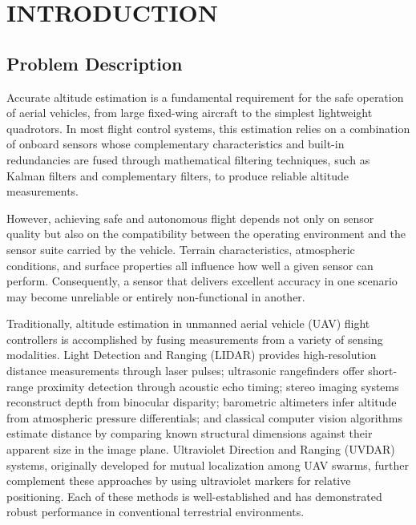 \section{INTRODUCTION}

\subsection{Problem Description}

Accurate altitude estimation is a fundamental requirement for the safe operation of aerial vehicles, from large fixed-wing aircraft to the simplest lightweight quadrotors. In most flight control systems, this estimation relies on a combination of onboard sensors whose complementary characteristics and built-in redundancies are fused through mathematical filtering techniques, such as Kalman filters and complementary filters, to produce reliable altitude measurements.

However, achieving safe and autonomous flight depends not only on sensor quality but also on the compatibility between the operating environment and the sensor suite carried by the vehicle. Terrain characteristics, atmospheric conditions, and surface properties all influence how well a given sensor can perform. Consequently, a sensor that delivers excellent accuracy in one scenario may become unreliable or entirely non-functional in another.

Traditionally, altitude estimation in unmanned aerial vehicle (UAV) flight controllers is accomplished by fusing measurements from a variety of sensing modalities. Light Detection and Ranging (LIDAR) provides high-resolution distance measurements through laser pulses; ultrasonic rangefinders offer short-range proximity detection through acoustic echo timing; stereo imaging systems reconstruct depth from binocular disparity; barometric altimeters infer altitude from atmospheric pressure differentials; and classical computer vision algorithms estimate distance by comparing known structural dimensions against their apparent size in the image plane. Ultraviolet Direction and Ranging (UVDAR) systems, originally developed for mutual localization among UAV swarms, further complement these approaches by using ultraviolet markers for relative positioning. Each of these methods is well-established and has demonstrated robust performance in conventional terrestrial environments.

